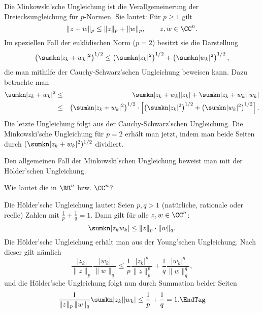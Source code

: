 \begin{antwort}
  Die Minkowski'sche Ungleichung ist die Verallgemeinerung der 
  Dreiecksungleichung für $p$-Normen. Sie lautet: Für $p\ge 1$ gilt 
  \[
  \|z + w \|_p \le \| z \|_p + \| w \|_p, 
  \qquad z,w \in \CC^n.
  \]
  Im speziellen Fall der euklidischen Norm ($p=2$) besitzt sie die 
  Darstellung
  \[
  \left( \sumkn |z_k +w_k |^2 \right)^{1/2} \le 
  \left( \sumkn |z_k|^2 \right)^{1/2} +
  \left( \sumkn |w_k|^2 \right)^{1/2},
  \]
  die man mithilfe der Cauchy-Schwarz'schen Ungleichung beweisen 
  kann. Dazu betrachte man
  \begin{eqnarray*}
    \sumkn |z_k+w_k|^2 &\le& 
    \sumkn |z_k+w_k| |z_k| + \sumkn |z_k+w_k||w_k| \\
    &\le& \left( \sumkn |z_k+w_k|^2 \right)^{1/2} \cdot  
    \left[ \left( \sumkn |z_k|^2 \right)^{1/2} + 
      \left( \sumkn |w_k|^2 \right)^{1/2} \right].
  \end{eqnarray*}
  Die letzte Ungleichung folgt aus der Cauchy-Schwarz'schen Ungleichung. 
  Die Minkowski'sche Ungleichung für $p=2$ erhält man jetzt, indem man 
  beide Seiten durch $(\sumkn |z_k+w_k|^2)^{1/2}$ dividiert.

  Den allgemeinen Fall der Minkowski'schen Ungleichung beweist man 
  mit der Hölder'schen Ungleichung. \AntEnd
\end{antwort}






\begin{frage}
  \label{hoelder}
  Wie lautet die  in $\RR^n$ bzw. $\CC^n$?
\end{frage}

\begin{antwort}
  Die Hölder'sche Ungleichung lautet: 
  Seien $p,q>1$ (natürliche, rationale 
  oder reelle) Zahlen mit $\frac{1}{p}+\frac{1}{q}=1$. Dann gilt 
  für alle $z,w\in\CC^n$:
  \[
  \sumkn |z_k w_k | \le \| z \|_p \cdot \| w\|_q. 
  \]
  Die Hölder'sche Ungleichung erhält man aus der Young'schen Ungleichung. 
  Nach dieser gilt nämlich 
  \[
  \frac{|z_k|}{\|z\|_p} \frac{|w_k|}{\|w\|_q} \le 
  \frac{1}{p} \frac{ |z_k|^p }{ \| z \|_p^p } + 
  \frac{1}{q} \frac{ |w_k|^q }{ \| w \|_q^q },
  \]
  und die Hölder'sche Ungleichung folgt nun durch Summation 
  beider Seiten
  \begin{equation}
    \frac{1}{ \| z\|_p\, \| w \|_q } \sumkn |z_k| |w_k| \le 
    \frac{1}{p}+\frac{1}{q} =1. \EndTag
  \end{equation}
\end{antwort}







